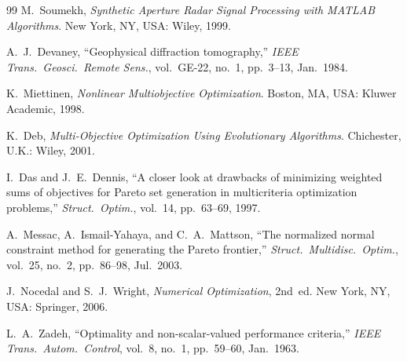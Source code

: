 \documentclass[journal]{IEEEtran}
\begin{document}
\begin{thebibliography}{99}
M.~Soumekh,
\emph{Synthetic Aperture Radar Signal Processing with MATLAB Algorithms}.
New York, NY, USA: Wiley, 1999.

A.~J.~Devaney,
``Geophysical diffraction tomography,''
\emph{IEEE Trans.\ Geosci.\ Remote Sens.}, vol.~GE-22, no.~1,
pp.~3--13, Jan.~1984.

K.~Miettinen,
\emph{Nonlinear Multiobjective Optimization}.
Boston, MA, USA: Kluwer Academic, 1998.

K.~Deb,
\emph{Multi-Objective Optimization Using Evolutionary Algorithms}.
Chichester, U.K.: Wiley, 2001.

I.~Das and J.~E.~Dennis,
``A closer look at drawbacks of minimizing weighted sums of objectives
for Pareto set generation in multicriteria optimization problems,''
\emph{Struct.\ Optim.}, vol.~14, pp.~63--69, 1997.

A.~Messac, A.~Ismail-Yahaya, and C.~A.~Mattson,
``The normalized normal constraint method for generating the Pareto
frontier,''
\emph{Struct.\ Multidisc.\ Optim.}, vol.~25, no.~2, pp.~86--98,
Jul.~2003.

J.~Nocedal and S.~J.~Wright,
\emph{Numerical Optimization}, 2nd~ed.
New York, NY, USA: Springer, 2006.

L.~A.~Zadeh,
``Optimality and non-scalar-valued performance criteria,''
\emph{IEEE Trans.\ Autom.\ Control}, vol.~8, no.~1, pp.~59--60,
Jan.~1963.

\end{thebibliography}
\end{document}
